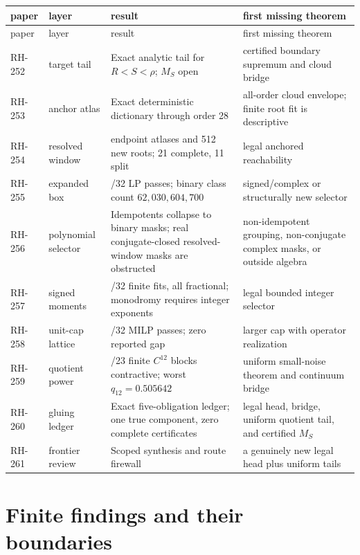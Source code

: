 \documentclass[11pt]{article}
\begin{document}
\small
\begin{longtable}{>{\raggedright\arraybackslash}p{}
>{\raggedright\arraybackslash}p{}
>{\raggedright\arraybackslash}p{}
>{\raggedright\arraybackslash}p{}}
\toprule
paper & layer & result & first missing theorem\\
\midrule
\endfirsthead
\toprule
paper & layer & result & first missing theorem\\
\midrule
\endhead
RH-252 & target tail & Exact analytic tail for $R<S<\rho$; $M_S$ open & certified boundary supremum and cloud bridge\\
RH-253 & anchor atlas & Exact deterministic dictionary through order 28 & all-order cloud envelope; finite root fit is descriptive\\
RH-254 & resolved window & 32 endpoint atlases and 512 new roots; 21 complete, 11 split & legal anchored reachability\\
RH-255 & expanded box & 0/32 LP passes; binary class count $62{,}030{,}604{,}700$ & signed/complex or structurally new selector\\
RH-256 & polynomial selector & Idempotents collapse to binary masks; real conjugate-closed resolved-window masks are obstructed & non-idempotent grouping, non-conjugate complex masks, or outside algebra\\
RH-257 & signed moments & 32/32 finite fits, all fractional; monodromy requires integer exponents & legal bounded integer selector\\
RH-258 & unit-cap lattice & 0/32 MILP passes; zero reported gap & larger cap with operator realization\\
RH-259 & quotient power & 23/23 finite $C^{12}$ blocks contractive; worst $q_{12}=0.505642$ & uniform small-noise theorem and continuum bridge\\
RH-260 & gluing ledger & Exact five-obligation ledger; one true component, zero complete certificates & legal head, bridge, uniform quotient tail, and certified $M_S$\\
RH-261 & frontier review & Scoped synthesis and route firewall & a genuinely new legal head plus uniform tails\\
\bottomrule
\end{longtable}
\normalsize

\section{Finite findings and their boundaries}
\end{document}
